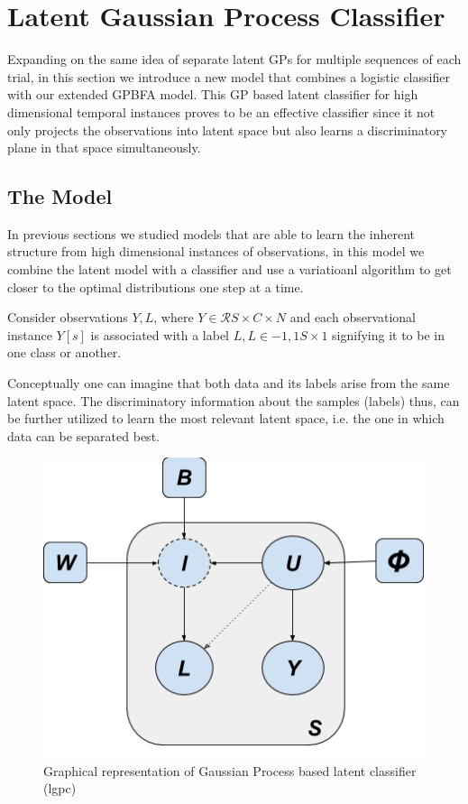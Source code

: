 \section{Latent Gaussian Process Classifier}

\thispagestyle{empty}
Expanding on the same idea of separate latent GPs for multiple sequences of each trial, in this section we introduce  a new model that combines a logistic classifier with our extended GPBFA model. This  GP based latent classifier for high dimensional temporal instances proves to be an effective classifier since it not only projects the observations into latent space but also learns a discriminatory plane in that space simultaneously.

\subsection{The Model}

In previous sections we studied models that are able to learn the inherent structure from high dimensional instances of observations, in this model we combine the latent model with a classifier and use a variatioanl algorithm to get closer to the optimal distributions one step at a time. 

Consider observations $ {Y,L}$, where $ Y \in \mathcal{R} S \times C \times N$ and each observational instance $Y[s]$ is associated with a label $L, L \in {-1,1} S \times 1$ signifying it to be in one class or another. 

Conceptually one can imagine that  both data and its labels arise from the same latent space. The discriminatory information about the samples (labels) thus, can be further utilized to learn the most relevant latent space, i.e. the one in which data can be separated best.

\begin{figure}
    \centering
    \includegraphics[scale=0.5]{thesis/images/LCMGP_Model.png}
    \caption{Graphical representation of Gaussian Process based latent classifier (lgpc)}
    \label{fig:lgpc}
\end{figure}

